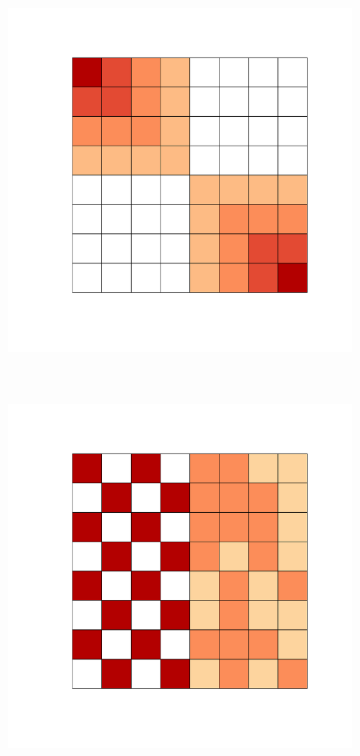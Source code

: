 \documentclass[
  shownotes,
  xcolor={svgnames},
  hyperref={colorlinks,citecolor=DarkBlue,linkcolor=DarkRed,urlcolor=DarkBlue}
   , aspectratio=169]{beamer}
\begin{document}
\begin{frame}[fragile]
\begin{minipage}[t]{0.52\linewidth}
    \end{minipage}
    \hfill
    \begin{minipage}[t]{0.43\linewidth}%
       \medskip
        \begin{figure}[H] 
          \begin{subfigure}{0.45\linewidth}
          \includegraphics[scale=.21]{figures/spatial_correlation.pdf}
          \end{subfigure} \\
          
          \begin{subfigure}{0.45\linewidth}
          \includegraphics[scale=.21]{figures/spatial_heterogeneity.pdf}
          \end{subfigure}


\end{figure}
\end{minipage}
\end{frame}
\end{document}
